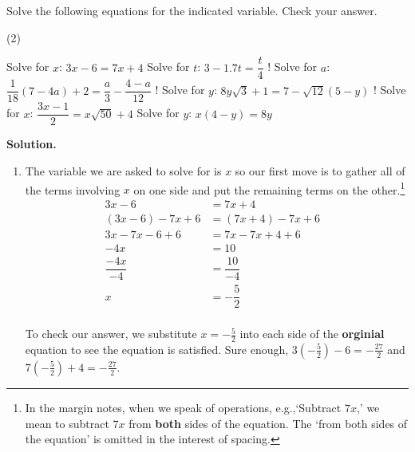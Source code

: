 \begin{ex}\label{lineareqnreview}  Solve the following equations for the indicated variable.  Check your answer.

\begin{tasks}(2)

\task  Solve for $x$: $3x - 6 = 7x + 4$
\task  Solve for $t$: $3 - 1.7t = \dfrac{t}{4}$
\task!  Solve for $a$: $\dfrac{1}{18}(7 - 4a) + 2 = \dfrac{a}{3} - \dfrac{4-a}{12}$
\task!  Solve for $y$:  $8 y \sqrt{3} + 1 = 7 - \sqrt{12}(5 - y)$
\task!  Solve for $x$: $\dfrac{3x-1}{2} = x\sqrt{50} + 4$
\task  Solve for $y$:  $x(4-y) = 8y$

\end{tasks}

{\bf Solution.} 

\begin{enumerate}

\item  The variable we are asked to solve for is $x$ so our first move is to gather all of the terms involving $x$ on one side and put the remaining terms on the other.\footnote{In the margin notes, when we speak of operations, e.g.,`Subtract $7x$,' we mean to subtract $7x$ from \textbf{both} sides of the equation.  The `from both sides of the equation' is omitted in the interest of spacing.}
\begin{align*}
3x - 6 &  = 7x + 4 & \\
(3x-6) - 7x + 6 &  = (7x+4) -7x +6 \tag{Subtract $7x$, add $6$} \\
3x - 7x - 6 + 6 & = 7x - 7x + 4 + 6 & \tag{Rearrange terms} \\
-4x & = 10 \tag{$3x-7x = (3-7)x = -4x$} \\
\dfrac{-4x}{-4} & = \dfrac{10}{-4} \tag{Divide by the coefficient of $x$} \\
x & = -\dfrac{5}{2} \tag{Reduce to lowest terms} \\
\end{align*}
											
To check our answer, we substitute $x = -\frac{5}{2}$ into each side of the \textbf{orginial} equation to see the equation is satisfied.  Sure enough, $3\left(-\frac{5}{2}\right) - 6 = -\frac{27}{2}$ and $7\left(-\frac{5}{2}\right) + 4 = -\frac{27}{2}$.


\end{enumerate}
\end{ex}
